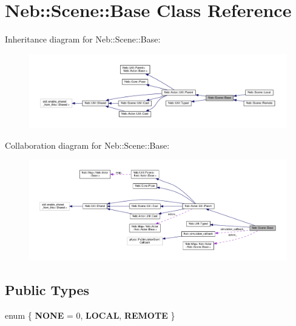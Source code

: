 \hypertarget{classNeb_1_1Scene_1_1Base}{\section{Neb\-:\-:Scene\-:\-:Base Class Reference}
\label{classNeb_1_1Scene_1_1Base}
}


Inheritance diagram for Neb\-:\-:Scene\-:\-:Base\-:
\nopagebreak
\begin{figure}[H]
\begin{center}
\leavevmode
\includegraphics[width=350pt]{classNeb_1_1Scene_1_1Base__inherit__graph}
\end{center}
\end{figure}


Collaboration diagram for Neb\-:\-:Scene\-:\-:Base\-:
\nopagebreak
\begin{figure}[H]
\begin{center}
\leavevmode
\includegraphics[width=350pt]{classNeb_1_1Scene_1_1Base__coll__graph}
\end{center}
\end{figure}
\subsection*{Public Types}
\begin{DoxyCompactItemize}
\item 
enum \{ {\bfseries N\-O\-N\-E} = 0, 
{\bfseries L\-O\-C\-A\-L}, 
{\bfseries R\-E\-M\-O\-T\-E}
 \}
\end{DoxyCompactItemize}
